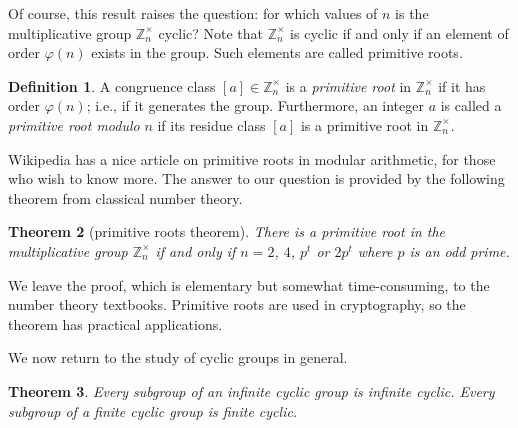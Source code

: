 \documentclass[11pt]{article}
\newtheorem{thm}{Theorem}[section]
\theoremstyle{definition}
\newtheorem{defn}[thm]{Definition}
\newcommand{\Z}{\mathbb{Z}} %
\begin{document}
Of course, this result raises the question: for which values of $n$ is
the multiplicative group $\Z_n^\times$ cyclic? Note that $\Z_n^\times$
is cyclic if and only if an element of order $\varphi(n)$ exists in
the group. Such elements are called primitive roots.

\begin{defn}
  A congruence class $[a] \in \Z_n^\times$ is a \emph{primitive root}
  in $\Z_n^\times$ if it has order $\varphi(n)$; i.e., if it generates
  the group. Furthermore, an integer $a$ is called a \emph{primitive
    root modulo} $n$ if its residue class $[a]$ is a primitive root in
  $\Z_n^\times$.
\end{defn}

Wikipedia has a nice article on primitive roots in modular
arithmetic, for those who wish to know more.  The answer to our
question is provided by the following theorem from classical number
theory.

\begin{thm}[primitive roots theorem]
  There is a primitive root in the multiplicative group $\Z_n^\times$
  if and only if $n = 2$, $4$, $p^t$ or $2p^t$ where $p$ is an odd
  prime.
\end{thm}

We leave the proof, which is elementary but somewhat time-consuming,
to the number theory textbooks. Primitive roots are used in
cryptography, so the theorem has practical applications.


We now return to the study of cyclic groups in general. 

\begin{thm}
  Every subgroup of an infinite cyclic group is infinite cyclic. Every
  subgroup of a finite cyclic group is finite cyclic.    
\end{thm}
\end{document}
